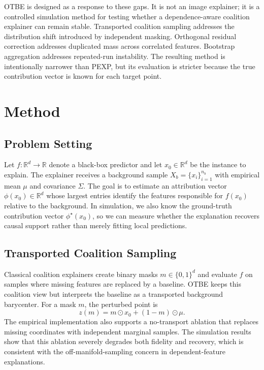 \documentclass[10pt,conference,letterpaper]{IEEEtran}
\newcommand{\method}{OTBE}
\newcommand{\R}{\mathbb{R}}
\begin{document}
\method{} is designed as a response to these gaps. It is not an image explainer; it is a controlled simulation method for testing whether a dependence-aware coalition explainer can remain stable. Transported coalition sampling addresses the distribution shift introduced by independent masking. Orthogonal residual correction addresses duplicated mass across correlated features. Bootstrap aggregation addresses repeated-run instability. The resulting method is intentionally narrower than PEXP, but its evaluation is stricter because the true contribution vector is known for each target point.
\section{Method}

\subsection{Problem Setting}
Let $f:\R^d\rightarrow\R$ denote a black-box predictor and let $x_0\in\R^d$ be the instance to explain.  The explainer receives a background sample $X_b=\{x_i\}_{i=1}^{n_b}$ with empirical mean $\mu$ and covariance $\Sigma$.  The goal is to estimate an attribution vector $\phi(x_0)\in\R^d$ whose largest entries identify the features responsible for $f(x_0)$ relative to the background.  In simulation, we also know the ground-truth contribution vector $\phi^\star(x_0)$, so we can measure whether the explanation recovers causal support rather than merely fitting local predictions.

\subsection{Transported Coalition Sampling}
Classical coalition explainers create binary masks $m\in\{0,1\}^d$ and evaluate $f$ on samples where missing features are replaced by a baseline.  \method{} keeps this coalition view but interprets the baseline as a transported background barycenter.  For a mask $m$, the perturbed point is
\begin{equation}
    z(m)=m\odot x_0+(1-m)\odot \mu .
\end{equation}
The empirical implementation also supports a no-transport ablation that replaces missing coordinates with independent marginal samples.  The simulation results show that this ablation severely degrades both fidelity and recovery, which is consistent with the off-manifold-sampling concern in dependent-feature explanations.
\end{document}
